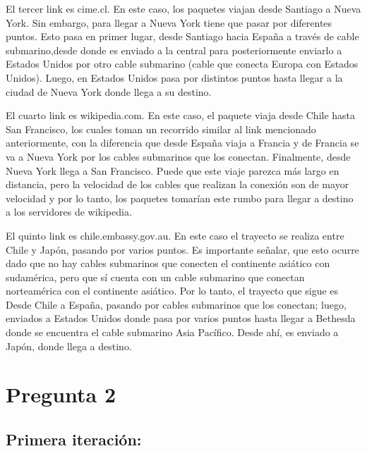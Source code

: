\documentclass[a4paper]{article}
\begin{document}
El tercer link es cime.cl. En este caso, los paquetes viajan desde Santiago a Nueva York. Sin embargo, para llegar a Nueva York tiene que pasar por diferentes puntos. Esto pasa en primer lugar, desde Santiago hacia España a través de cable submarino,desde donde es enviado a la central para posteriormente enviarlo a Estados Unidos por otro cable submarino (cable que conecta Europa con Estados Unidos).
Luego, en Estados Unidos pasa por distintos puntos hasta llegar a la ciudad de Nueva York donde llega a su destino.

El cuarto link es wikipedia.com. En este caso, el paquete viaja desde Chile hasta San Francisco, los cuales toman un recorrido similar al link mencionado anteriormente, con la diferencia que desde España viaja a Francia y de Francia se va a Nueva York por los cables submarinos que los conectan. Finalmente, desde Nueva York llega a San Francisco. 
Puede que este viaje parezca más largo en distancia, pero la velocidad de los cables que realizan la conexión son de mayor velocidad y por lo tanto, los paquetes tomarían este rumbo para llegar a destino a los servidores de wikipedia. 

El quinto link es chile.embassy.gov.au. En este caso el trayecto se realiza entre Chile y Japón, pasando por varios puntos. Es importante señalar, que esto ocurre dado que no hay cables submarinos que conecten el continente asiático con sudamérica, pero que sí cuenta con un cable submarino que conectan norteamérica con el continente asiático.
Por lo tanto, el trayecto que sigue es Desde Chile a España, pasando por cables submarinos que los conectan; luego, enviados a Estados Unidos donde pasa por varios puntos hasta llegar a Bethesda donde se encuentra el cable submarino Asia Pacífico. Desde ahí, es enviado a Japón, donde llega a destino.


\section{Pregunta 2}

\subsection{Primera iteración:}
\end{document}
